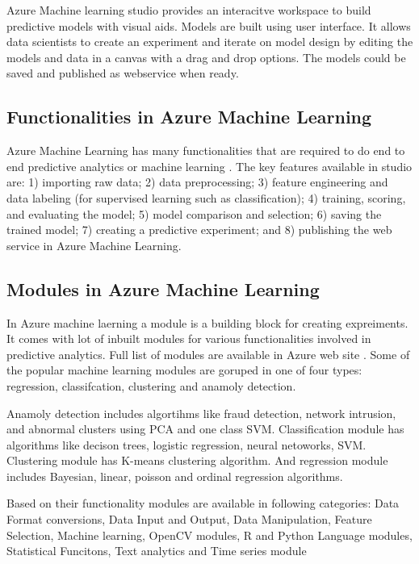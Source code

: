 \documentclass[9pt,twocolumn,twoside]{../../styles/osajnl}
\begin{document}
Azure Machine learning studio provides an interacitve workspace to
build predictive models with visual aids. Models are built using user
interface. It allows data scientists to create an experiment and
iterate on model design by editing the models and data in a canvas
with a drag and drop options.  The models could be saved and published
as webservice when ready. 

\subsection{Functionalities in Azure Machine Learning}

Azure Machine Learning has many functionalities that are required to
do end to end predictive analytics or machine
learning \cite{www-azureMLStudioCapabilities}. The key features
available in studio are: 1) importing raw data; 2) data preprocessing;
3) feature engineering and data labeling (for supervised learning such
as classification); 4) training, scoring, and evaluating the model; 5)
model comparison and selection; 6) saving the trained model; 7)
creating a predictive experiment; and 8) publishing the web service in
Azure Machine Learning.

\subsection{Modules in Azure Machine Learning}
In Azure machine laerning a module is a building block for creating
expreiments. It comes with lot of inbuilt modules for various
functionalities involved in predictive analytics. Full list of modules
are available in Azure web site \cite{www-azureMLModules}. Some of the
popular machine learning modules are goruped in one of four types:
regression, classifcation, clustering and anamoly detection.

Anamoly detection includes algortihms like fraud detection, network
intrusion, and abnormal clusters using PCA and one class
SVM. Classification module has algorithms like decison trees, logistic
regression, neural netoworks, SVM. Clustering module has K-means
clustering algorithm. And regression module includes Bayesian, linear,
poisson and ordinal regression algorithms.

Based on their functionality modules are available in following
categories: Data Format conversions, Data Input and Output, Data
Manipulation, Feature Selection, Machine learning, OpenCV modules, R
and Python Language modules, Statistical Funcitons, Text analytics and
Time series module \cite{www-azureMLModuleCategories}
\end{document}
